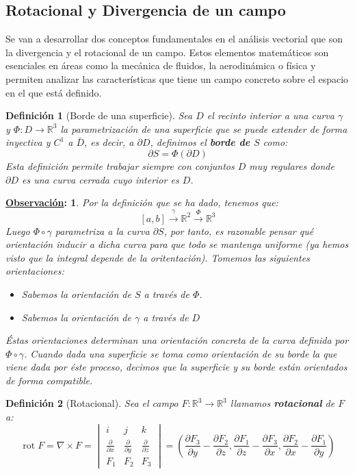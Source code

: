 \documentclass[10pt,a4paper,openright]{book}
\theoremstyle{break}
\newtheorem*{defi}{Definición}
\newtheorem*{obs}{\underline{Observación}:}
\DeclareMathOperator{\rot}{rot}
\begin{document}
\subsection{Rotacional y Divergencia de un campo}
Se van a desarrollar dos conceptos fundamentales en el análisis vectorial que son la divergencia y el rotacional de un campo. Estos elementos matemáticos son esenciales en áreas como la mecánica de fluidos, la aerodinámica o física y permiten analizar las características que tiene un campo concreto sobre el espacio en el que está definido.

\begin{defi}[Borde de una superficie]
Sea $D$ el recinto interior a una curva $\gamma$ y $\Phi: D \rightarrow \mathbb{R}^3$ la parametrización de una superficie que se puede extender de forma inyectiva y $C^1$ a $\bar{D}$, es decir, a $\partial D$, definimos el \textbf{borde de $S$} como:
$$\partial S = \Phi\left( \partial D \right)$$
Esta definición permite trabajar siempre con conjuntos $D$ muy regulares donde $\partial D$ es una curva cerrada cuyo interior es $D$.
\end{defi}
\begin{obs}
Por la definición que se ha dado, tenemos que: 
$$\left[ a, b \right] \xrightarrow{\gamma} \mathbb{R}^2 \xrightarrow{\Phi} \mathbb{R}^3$$
Luego $\Phi \circ \gamma$ parametriza a la curva $\partial S$, por tanto, es razonable pensar qué orientación inducir a dicha curva para que todo se mantenga uniforme (ya hemos visto que la integral depende de la oritentación). Tomemos las siguientes orientaciones: 
    \begin{itemize}
        \item Sabemos la orientación de $S$ a través de $\Phi$. 
        \item Sabemos la orientación de $\gamma$ a través de $D$
    \end{itemize}
Éstas orientaciones determinan una orientación concreta de la curva definida por $\Phi \circ \gamma$. Cuando dada una superficie se toma como orientación de su borde la que viene dada por éste proceso, decimos que la superficie y su borde están orientados de forma compatible.
\end{obs}

\begin{defi}[Rotacional]
Sea el campo $F: \mathbb{R}^3 \rightarrow \mathbb{R}^3$ llamamos \textbf{rotacional} de $F$ a: 
$$\rot F = \nabla \times F = \begin{vmatrix} i & j & k\\
\frac{\partial}{\partial x} & \frac{\partial }{\partial y} & \frac{\partial }{\partial z} \\
F_1 & F_2 & F_3\end{vmatrix} = \left( \frac{\partial F_3}{\partial y} - \frac{\partial F_2}{\partial z}, \frac{\partial F_1}{\partial z} - \frac{\partial F_3}{\partial x}, \frac{\partial F_2}{\partial x} - \frac{\partial F_1}{\partial y} \right)$$
\end{defi}
\end{document}
